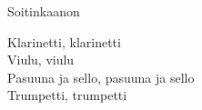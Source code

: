 \begin{song}{Soitinkaanon}


    Klarinetti, klarinetti\\
    Viulu, viulu\\
    Pasuuna ja sello, pasuuna ja sello\\
    Trumpetti, trumpetti

\end{song}